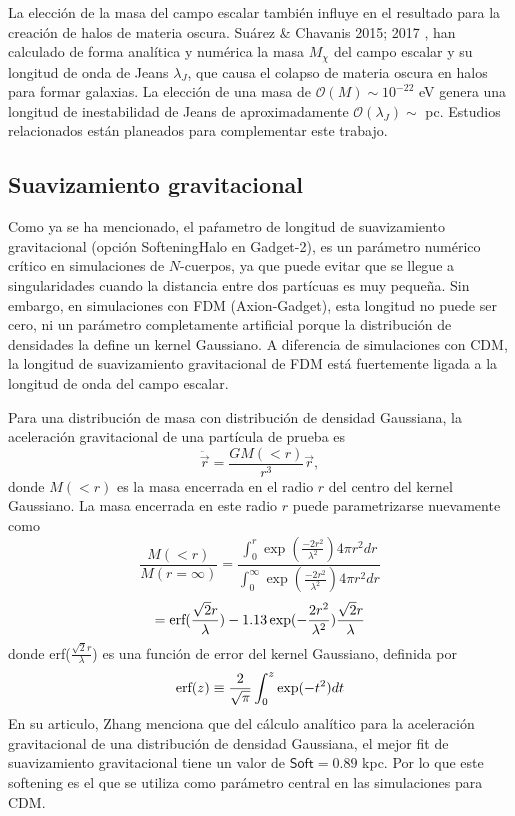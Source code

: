 \documentclass[a4paper,openright,10pt, oneside, final]{book}
\begin{document}
La elección de la masa del campo escalar también influye en el resultado para la creación de halos de materia oscura. Suárez \& Chavanis 2015; 2017 \cite{4.3.6, 4.3.7}, han calculado de forma analítica y numérica la masa $M_{\chi}$ del campo escalar y su longitud de onda de Jeans $\lambda_{J}$, que causa el colapso de materia oscura en halos para formar galaxias. La elección de una masa de $\mathcal{O}(M)\sim 10^{-22}$ eV  genera una longitud de inestabilidad de Jeans de aproximadamente $\mathcal{O}(\lambda_{J})\sim$ pc. Estudios relacionados están planeados para complementar este trabajo.

\subsection*{Suavizamiento gravitacional}
Como ya se ha mencionado, el paŕametro de longitud de suavizamiento gravitacional (opción \textsf{SofteningHalo} en Gadget-2), es un parámetro numérico crítico en simulaciones de $N$-cuerpos, ya que puede evitar que se llegue a singularidades cuando la distancia entre dos partícuas es muy pequeña. Sin embargo, en simulaciones con FDM (Axion-Gadget), esta longitud no puede ser cero, ni un parámetro completamente artificial porque la distribución de densidades la define un kernel Gaussiano. A diferencia de simulaciones con CDM, la longitud de suavizamiento gravitacional de FDM está fuertemente ligada a la longitud de onda del campo escalar.

Para una distribución de masa con distribución de densidad Gaussiana, la aceleración gravitacional de una partícula de prueba es
\begin{equation}
\ddot{\vec{r}}= \frac{G M(<r)}{r^{3}}\vec{r},
\end{equation}
donde $M(<r)$ es la masa encerrada en el radio $r$ del centro del kernel Gaussiano. La masa encerrada en este radio $r$ puede parametrizarse nuevamente como
\begin{equation*}
\frac{M(<r)}{M(r=\infty)} = \frac{\int_{0}^{r}\exp(\frac{-2r^{2}}{\lambda^{2}})4\pi r^{2}dr}{\int_{0}^{\infty}\exp(\frac{-2r^{2}}{\lambda^{2}})4\pi r^{2}dr}
\end{equation*}
\begin{equation}
= \textup{erf}(\frac{\sqrt{2}r}{\lambda}) -1.13\exp(-\frac{2r^{2}}{\lambda^{2}})\frac{\sqrt{2}r}{\lambda}
\end{equation}
donde erf($\frac{\sqrt{2}r}{\lambda}$) es una función de error del kernel Gaussiano, definida por
\begin{equation*}
\textup{erf}(z) \equiv \frac{2}{\sqrt{\pi}}\int_{0}^{z}\exp(-t^{2})dt
\end{equation*}
En su articulo, Zhang menciona que del cálculo analítico para la aceleración gravitacional de una distribución de densidad Gaussiana, el mejor fit de suavizamiento gravitacional tiene un valor de $\textsf{Soft}=0.89$ kpc. Por lo que este softening es el que se utiliza como parámetro central en las simulaciones para CDM.
\end{document}
